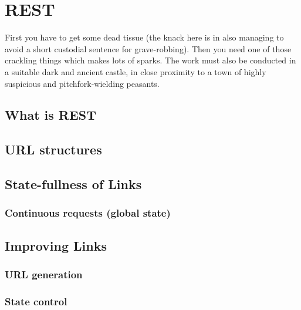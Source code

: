 
\chapter{REST}

First you have to get some dead tissue (the knack here is in also managing to
avoid a short custodial sentence for grave-robbing). Then you need one of
those crackling things which makes lots of sparks. The work must also be
conducted in a suitable dark and ancient castle, in close proximity to a town
of highly suspicious and pitchfork-wielding peasants.

\section{What is REST}

\section{URL structures}

\section{State-fullness of Links}

\subsection{Continuous requests (global state)}

\section{Improving Links}

\subsection{URL generation}

\subsection{State control}
